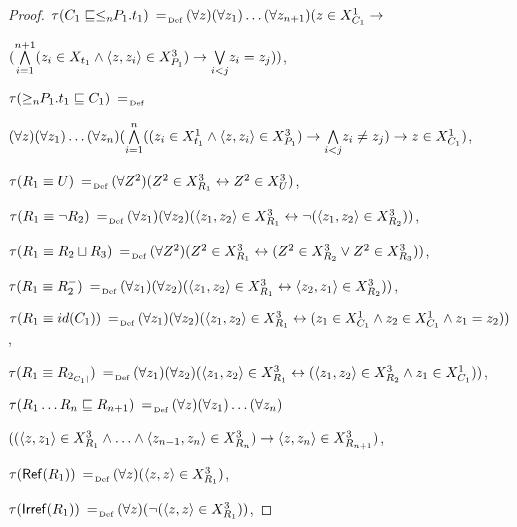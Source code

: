 \documentclass[a4paper]{llncs}
\newcommand{\defAs}{\mathrel{\makebox{\:= \hspace{-.2cm} \raisebox{-0.5 ex}[0 ex][0 ex]{\tiny Def}}}}
\newcommand{\refl}{\mathsf{Ref}}
\newcommand{\irref}{\mathsf{Irref}}
\begin{document}
\begin{proof}
{\noindent $\tau(C_1 \sqsubseteq \leq_n\!\! P_1.t_1) \defAs (\forall z)(\forall z_1)\ldots (\forall z_{n+1})(z \in X_{C_1}^1 \rightarrow$

\noindent $\hfill ( \overset {n+1} { \underset{i=1}\bigwedge }(z_i \in X_{t_1} \wedge \langle z,z_i\rangle \in X_{P_1}^3) \rightarrow \underset{i<j} {\bigvee} z_i = z_j))$,

\noindent $\tau(\geq_n\!\! P_1.t_1 \sqsubseteq C_1) \defAs$

\noindent $\hfill (\forall z)(\forall z_1)\ldots (\forall z_{n})( \overset {n} { \underset {i=1}\bigwedge}((z_i \in X_{t_1}^1 \wedge \langle z,z_i\rangle \in X_{P_1}^3) \rightarrow \underset {i<j} {\bigwedge} z_i \neq z_j) \rightarrow z \in X_{C_1}^1)$,

\noindent $\tau(R_1 \equiv U) \defAs (\forall Z^2)(Z^2 \in X_{R_1}^3 \leftrightarrow Z^2 \in X_{U}^3)$,

\noindent $\tau(R_1 \equiv \neg R_2) \defAs (\forall z_1)(\forall z_2)(\langle z_1,z_2\rangle \in X_{R_1}^3 \leftrightarrow \neg (\langle z_1,z_2\rangle \in X_{R_2}^3 ))$,

\noindent $\tau(R_1 \equiv R_2 \sqcup R_3) \defAs (\forall Z^2)(Z^2 \in X_{R_1}^3 \leftrightarrow (Z^2 \in X_{R_2}^3 \vee Z^2 \in X_{R_3}^3))$,

\noindent $\tau(R_1 \equiv R_2^{-}) \defAs (\forall z_1)(\forall z_2)(\langle z_1,z_2\rangle \in X_{R_1}^3 \leftrightarrow \langle z_2,z_1\rangle \in X_{R_2}^3 ))$,

\noindent $\tau(R_1 \equiv id(C_1)) \defAs (\forall z_1)(\forall z_2)(\langle z_1,z_2\rangle \in X_{R_1}^3 \leftrightarrow (z_1 \in X_{C_1}^1 \wedge z_2 \in X_{C_1}^1 \wedge z_1 =z_2))$,



\noindent $\tau(R_1 \equiv R_{2_{C_1 |}}) \defAs (\forall z_1)(\forall z_2)(\langle z_1,z_2\rangle \in X_{R_1}^3 \leftrightarrow  (\langle z_1,z_2\rangle \in X_{R_2}^3 \wedge z_1 \in X_{C_1}^1))$,

\noindent $\tau(R_1 \ldots R_n \sqsubseteq R_{n+1}) \defAs (\forall z)(\forall z_1)\ldots (\forall z_{n})$

\noindent $\hfill ((\langle z, z_1\rangle \in X_{R_1}^3 \wedge \ldots \wedge \langle z_{n-1},z_n\rangle \in X_{R_{n}}^3) \rightarrow  \langle z, z_n\rangle\in X_{R_{n+1}}^3)$,

\noindent $\tau(\refl(R_1)) \defAs (\forall z)(\langle z, z\rangle \in X_{R_1}^3)$,

\noindent $\tau(\irref(R_1)) \defAs (\forall z)(\neg (\langle z,z\rangle \in X_{R_1}^3))$,

}
\end{proof}
\end{document}

